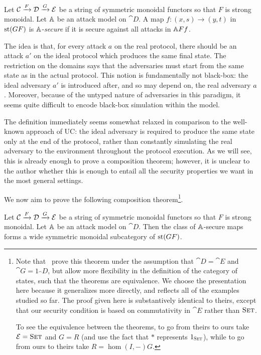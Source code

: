 \begin{dfn}
  Let $\cat{C}\xto{F}\cat{D}\xto{G}\cat{E}$ be a string of
  symmetric monoidal functors so that $F$ is strong monoidal. Let $\AA$ be an
  attack model on $\cat{D}$. A map $f: (x, s)\to (y, t)$ in $\state{GF}$ is
  $\AA$-\emph{secure} if it is secure against all attacks in $\AA Ff$.
\end{dfn}

The idea is that, for every attack $a$ on the real protocol, there should be an
attack $a'$ on the ideal protocol which produces the same final state. The
restriction on the domains says that the adversaries must start from the same
state as in the actual protocol. This notion is fundamentally not black-box: the
ideal adversary $a'$ is introduced after, and so may depend on, the real
adversary $a$. Moreover, because of the untyped nature of adversaries in this
paradigm, it seems quite difficult to encode black-box simulation within the
model.

The definition immediately seems somewhat relaxed in comparison to the well-known
approach of UC: the ideal adversary is required to produce the same state only
at the end of the protocol, rather than constantly simulating the real adversary
to the environment throughout the protocol execution. As we will see, this is
already enough to prove a composition theorem; however, it is unclear to the
author whether this is enough to entail all the security properties we want in
the most general settings.

We now aim to prove the following composition theorem\footnote{
  Note that~\cite{broadbent-karvonen-2022} prove this theorem under the
  assumption that $\cat{D} = \cat{E}$ and $\cat{G} = 1_\cat{D}$, but allow more
  flexibility in the definition of the category of states, such that the
  theorems are equivalence. We choose the presentation here because it
  generalizes more directly, and reflects all of the examples studied so far.
  The proof given here is substantively identical to theirs, except that our
  security condition is based on commutativity in $\cat{E}$ rather than
  $\scat{Set}$.

  To see the equivalence between the theorems, to go from theirs to ours take
  $\cat{E} = \scat{Set}$ and $G = R$ (and use the fact that $*$ represents
  $1_\scat{Set}$), while to go from ours to theirs take $R = \hom(I, -)G$.
}.

\begin{thm}\label{ccc:composition}
  Let $\cat{C}\xto{F}\cat{D}\xto{G}\cat{E}$ be a string of symmetric monoidal
  functors so that $F$ is strong monoidal. Let $\AA$ be an attack model on
  $\cat{D}$. Then the class of $\AA$-secure maps forms a wide symmetric monoidal
  subcategory of $\state{GF}$.
\end{thm}

